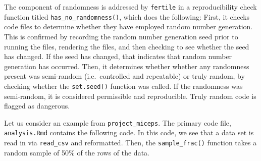 \documentclass[12pt,twoside]{reedthesis}
\begin{document}
The component of randomness is addressed by \texttt{fertile} in a reproducibility check function titled \texttt{has\_no\_randomness()}, which does the following: First, it checks code files to determine whether they have employed random number generation. This is confirmed by recording the random number generation seed prior to running the files, rendering the files, and then checking to see whether the seed has changed. If the seed has changed, that indicates that random number generation has occurred. Then, it determines whether whether any randomness present was semi-random (i.e.~controlled and repeatable) or truly random, by checking whether the \texttt{set.seed()} function was called. If the randomness was semi-random, it is considered permissible and reproducible. Truly random code is flagged as dangerous.

Let us consider an example from \texttt{project\_miceps}. The primary code file, \texttt{analysis.Rmd} contains the following code. In this code, we see that a data set is read in via \texttt{read\_csv} and reformatted. Then, the \texttt{sample\_frac()} function takes a random sample of 50\% of the rows of the data.
\end{document}
